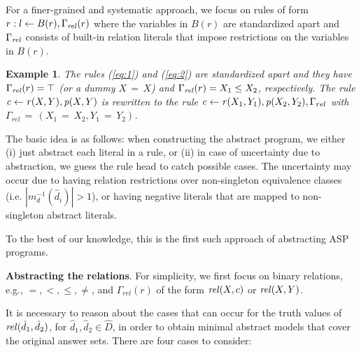 \documentclass{new_tlp}
\newcommand{\leanparagraph}[1]{\smallskip\noindent\textbf{#1}. }
\def\mi#1{\mathit{#1\/}}
\def\beq{\begin{equation}}
\def\eeq#1{\label{#1}\end{equation}}
\newtheorem{exmp}{Example}
\begin{document}
For a finer-grained and systematic approach,
we focus on rules of form $r: l \leftarrow B(r), \Gamma_{\mi{rel}}(r)$
where the variables 
in $B(r)$ are standardized apart
and $\Gamma_{\mi{rel}}$ consists
of built-in relation literals that
impose restrictions 
on the variables in $B(r)$.

\begin{exmp}
\label{ex:standardize}
The rules  (\ref{eq:1}) and (\ref{eq:2}) are standardized apart and they
have  $\Gamma_{\mi{rel}}(r)=\top$ (or a dummy $X\,{=}\,X$) and
$\Gamma_{\mi{rel}}(r)=X_1\leq X_2$, respectively. The rule $\mi{c} \leftarrow
\mi{r}(X,Y), \mi{p}(X,Y)$ is rewritten to the rule $\mi{c} \leftarrow
\mi{r}(X_1,Y_1), \mi{p}(X_2,Y_2),\Gamma_{rel}$ with $\Gamma_{rel}\,{=}\, (X_1\,{=}\,X_2,Y_1\,{=}\,Y_2)$.
\end{exmp}
%
The basic idea is as follows:
when
constructing the abstract program, we either (i) just abstract each
literal in a rule, or (ii) in case of uncertainty due to abstraction,
we guess the rule head to catch possible cases. The uncertainty may
occur 
due to having relation restrictions over non-singleton equivalence
classes
(i.e. $|m_d^{-1}(\hat{d}_i)|>1$), 
or having negative literals that are mapped to non-singleton abstract literals.


To the best of our knowledge, this is the first such approach of abstracting ASP programs.


\leanparagraph{Abstracting the relations} For simplicity, we first
focus on binary relations, e.g., $=,<,\leq,\neq$, 
and $\Gamma_{rel}(r)$ 
of the form $\mi{rel}(X,c)$ or $\mi{rel}(X,Y)$.

It is necessary to %
reason about the cases that can occur for the truth values of ${\mi{rel}}(\hat{d}_1,\hat{d}_2)$, for $\hat{d}_1,\hat{d}_2 \in \widehat{D}$, in order to obtain minimal abstract models that cover the original answer sets. There are four cases to consider:
\end{document}

